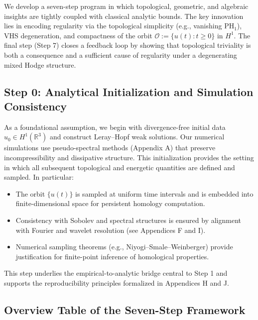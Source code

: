\documentclass[11pt]{article}
\theoremstyle{definition}
\begin{document}
We develop a seven-step program in which topological, geometric, and algebraic insights are tightly coupled with classical analytic bounds. The key innovation lies in encoding regularity via the topological simplicity (e.g., vanishing $\mathrm{PH}_1$), VHS degeneration, and compactness of the orbit $\mathcal{O} := \{ u(t) : t \ge 0 \}$ in $H^1$. The final step (Step 7) closes a feedback loop by showing that topological triviality is both a consequence and a sufficient cause of regularity under a degenerating mixed Hodge structure.

\subsection*{Step 0: Analytical Initialization and Simulation Consistency}

As a foundational assumption, we begin with divergence-free initial data $u_0 \in H^1(\mathbb{R}^3)$ and construct Leray--Hopf weak solutions. Our numerical simulations use pseudo-spectral methods (Appendix A) that preserve incompressibility and dissipative structure. This initialization provides the setting in which all subsequent topological and energetic quantities are defined and sampled. In particular:
\begin{itemize}
  \item The orbit $\{ u(t) \}$ is sampled at uniform time intervals and is embedded into finite-dimensional space for persistent homology computation.
  \item Consistency with Sobolev and spectral structures is ensured by alignment with Fourier and wavelet resolution (see Appendices F and I).
  \item Numerical sampling theorems (e.g., Niyogi--Smale--Weinberger) provide justification for finite-point inference of homological properties.
\end{itemize}

This step underlies the empirical-to-analytic bridge central to Step 1 and supports the reproducibility principles formalized in Appendices H and J.

\subsection*{Overview Table of the Seven-Step Framework}
\end{document}
